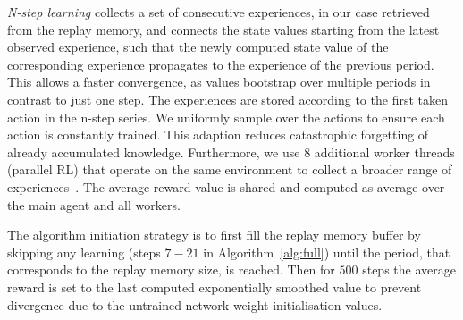 \documentclass[envcountsame]{llncs}
\newcommand\MS[2][r]{\ifx t#1 \textcolor{blue}{[\textbf{MS:} #2]}
  \else \begin{center}\textcolor{blue}{\textbf{MS:} #2} \end{center} \fi}
\begin{document}
\textit{N-step learning} collects a set of consecutive experiences, in our case retrieved from the
replay memory, and connects the state values starting from the latest observed experience, such that
the newly computed state value of the corresponding experience propagates to the experience of the
previous period. This allows a faster convergence, as values bootstrap over multiple periods in
contrast to just one step. The experiences are stored according to the first taken action in the
n-step series. We uniformly sample over the actions to ensure each action is constantly trained.
This adaption reduces catastrophic forgetting of already accumulated knowledge.
%
%
Furthermore, we use \(8\) additional \textsf{worker threads} (parallel RL) that operate on the same
environment to collect a broader range of experiences~\citep[as e.g. in][]{mnih2016asynchronous}.
%
The average reward value is shared and computed as average over the main agent and all workers.
%
%
%
%




%
%


The algorithm initiation strategy is to first fill the replay memory buffer by skipping any learning
(steps \(7-21\) in Algorithm~\ref{alg:full}) until the period, that corresponds to the replay
memory size, is reached. Then for \(500\) steps the average reward is set to the last computed
exponentially smoothed value to prevent divergence due to the untrained network weight
initialisation values.
\end{document}
